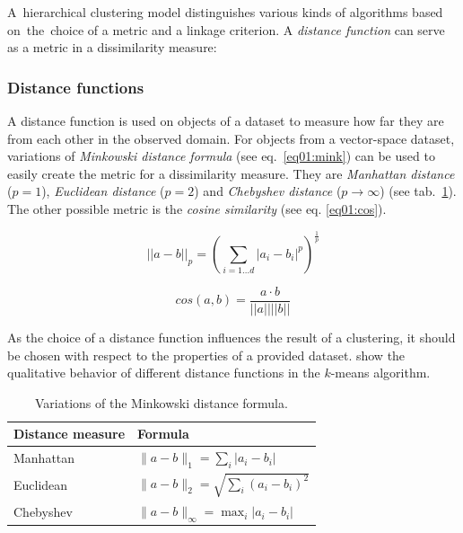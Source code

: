 A~hierarchical clustering model distinguishes various kinds of algorithms based on~the~choice of a metric and a linkage criterion. A \emph{distance function} can serve as a metric in a dissimilarity measure:

\subsubsection{Distance functions}

A distance function is used on objects of a dataset to measure how far they are from each other in the observed domain. For objects from a vector-space dataset, variations of \emph{Minkowski distance formula} (see eq.~\ref{eq01:mink}) can be used to easily create the metric for a dissimilarity measure.
They are \emph{Manhattan distance} ($p=1$), \emph{Euclidean distance} ($p=2$) and \emph{Chebyshev distance} ($p \to \infty$) (see tab.~\ref{tab01:mink}). The other possible metric is the \emph{cosine similarity} (see eq. \ref{eq01:cos}).

\begin{equation}\label{eq01:mink}
||a-b||_p = (\sum_{i=1...d}|a_i-b_i|^p)^{\frac{1}{p}}
\end{equation}

\begin{equation}\label{eq01:cos}
cos(a,b) = \dfrac{a\cdot b}{||a||||b||}
\end{equation}

As the choice of a distance function influences the result of a clustering, it should be chosen with respect to the properties of a provided dataset. \citet{aggarwal2001surprising} show the qualitative behavior of different distance functions in the $k$-means algorithm.



\begin{table}[t]
	\centering
	\renewcommand{\arraystretch}{1.3}
	\begin{tabular}{ll}
		\toprule
		Distance measure & Formula \\
		\midrule
		Manhattan & $\|a-b\|_1 = \sum_{i}|a_i-b_i|$          \\
		Euclidean & $\|a-b\|_2 = \sqrt{\sum_{i}(a_i-b_i)^2}$ \\
		Chebyshev & $\|a-b\|_\infty = \max_{i}|a_i-b_i|$  \\
		\bottomrule
	\end{tabular}
	\caption{Variations of the Minkowski distance formula.}
	\label{tab01:mink}
\end{table}


